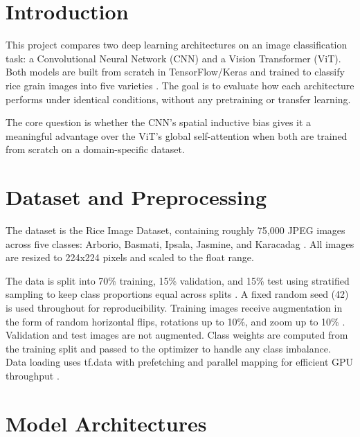 

\section{Introduction}

This project compares two deep learning architectures on an image classification task: a Convolutional Neural Network (CNN) and a Vision Transformer (ViT). Both models are built from scratch in TensorFlow/Keras and trained to classify rice grain images into five varieties . The goal is to evaluate how each architecture performs under identical conditions, without any pretraining or transfer learning.

The core question is whether the CNN's spatial inductive bias gives it a meaningful advantage over the ViT's global self-attention when both are trained from scratch on a domain-specific dataset.

\section{Dataset and Preprocessing}

The dataset is the Rice Image Dataset, containing roughly 75,000 JPEG images across five classes: Arborio, Basmati, Ipsala, Jasmine, and Karacadag . All images are resized to 224x224 pixels and scaled to the float range.

The data is split into 70\% training, 15\% validation, and 15\% test using stratified sampling to keep class proportions equal across splits . A fixed random seed (42) is used throughout for reproducibility. Training images receive augmentation in the form of random horizontal flips, rotations up to 10\%, and zoom up to 10\% . Validation and test images are not augmented. Class weights are computed from the training split and passed to the optimizer to handle any class imbalance. Data loading uses tf.data with prefetching and parallel mapping for efficient GPU throughput .

\section{Model Architectures}

